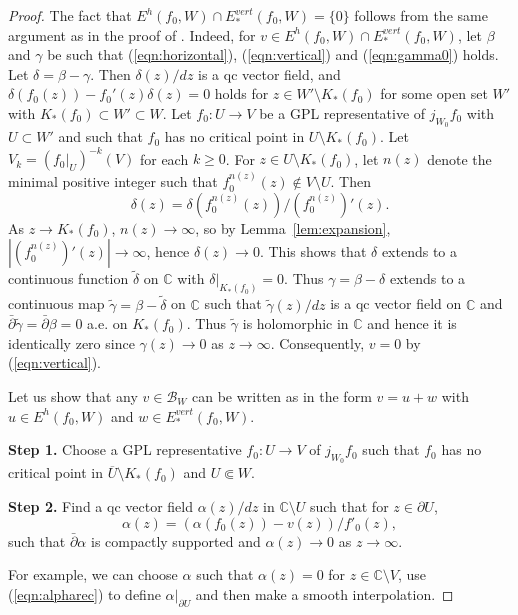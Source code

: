 \documentclass{amsart}
\numberwithin{equation}{section}
\newcommand{\C}{\mathbb C}
\theoremstyle{definition}
\theoremstyle{remark}
\begin{document}
\begin{proof} The fact that $E^h(f_0,W)\cap E_*^{vert}(f_0,W)=\{0\}$ follows from the same argument as in the proof of \cite[Lemma 4.7]{L2}. Indeed, for $v\in E^h(f_0,W)\cap E^{vert}_*(f_0,W)$, let $\beta$ and $\gamma$ be such that (\ref{eqn:horizontal}), (\ref{eqn:vertical}) and (\ref{eqn:gamma0}) holds. Let $\delta=\beta-\gamma$. Then $\delta(z)/dz$ is a qc vector field, and $\delta(f_0(z))-f_0'(z) \delta(z)=0$ holds for $z\in W'\setminus K_*(f_0)$ for some open set $W'$ with $K_*(f_0)\subset W'\subset W$. Let $f_0:U\to V$ be a GPL representative of $j_{W_0}f_0$ with $U\subset W'$ and such that $f_0$ has no critical point in $U\setminus K_*(f_0)$. Let $V_k=(f_0|_U)^{-k}(V)$ for each $k\ge 0$. For $z\in U\setminus K_*(f_0)$, let $n(z)$ denote the minimal positive integer such that $f_0^{n(z)}(z)\not\in V\setminus U$. Then $$\delta(z)=\delta(f_0^{n(z)}(z))/(f_0^{n(z)})'(z).$$
As $z\to K_*(f_0)$, $n(z)\to \infty$, so by Lemma~\ref{lem:expansion}, $|(f_0^{n(z)})'(z)|\to\infty$, hence $\delta(z)\to 0$. This shows that $\delta$ extends to a continuous function $\widetilde{\delta}$ on $\C$ with $\delta|_{K_*(f_0)}=0$. Thus $\gamma=\beta-\delta$ 
extends to a continuous map $\widetilde{\gamma}=\beta-\widetilde{\delta}$ on $\C$ such that $\widetilde{\gamma}(z)/dz$ is a qc vector field on $\C$ and $\bar{\partial}\widetilde{\gamma}=\bar{\partial} \beta=0$ a.e. on $K_*(f_0)$. Thus $\widetilde{\gamma}$ is holomorphic in $\C$ and hence it is identically zero since $\gamma(z)\to 0$ as $z\to\infty$. Consequently, $v=0$ by (\ref{eqn:vertical}).

Let us show that any $v\in \mathcal{B}_{W}$ can be written as in the form $v=u+w$ with $u\in E^h(f_0,W)$ and $w\in E^{vert}_*(f_0,W)$. 

{\bf Step 1.} Choose a GPL representative $f_0:U\to V$ of $j_{W_0} f_0$ such that $f_0$ has no critical point in $\overline{U}\setminus K_*(f_0)$ and $U\Subset W$. 


{\bf Step 2.} Find a qc vector field $\alpha(z)/dz$ in $\C\setminus U$ such that
for $z \in \partial U$,
\begin{equation}\label{eqn:alpharec} 
\alpha(z)=(\alpha(f_0(z))-v(z))/f'_0(z),
\end{equation}
such that $\bar{\partial}\alpha$ is compactly supported and $\alpha(z)\to 0$ as $z\to\infty$. 

For example, we can choose $\alpha$ such that $\alpha(z)=0$ for $z\in \C\setminus V$, use (\ref{eqn:alpharec}) to define $\alpha|_{\partial U}$ and then make a smooth interpolation. 


\end{proof}
\end{document}
